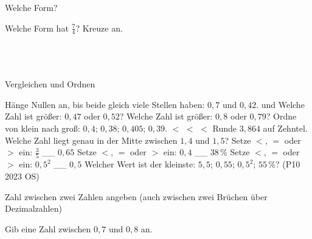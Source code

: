 \setcounter{aufgabe}{24}

\begin{aufgabe}{Welche Form?}
\begin{teile}
\teil Welche Form hat $\frac{7}{4}$? Kreuze an.\\ \\ \\ \\ 
\end{teile}
\end{aufgabe}

\begin{aufgabe}{Vergleichen und Ordnen}
\begin{teile}
\teil Hänge Nullen an, bis beide gleich viele Stellen haben: $0{,}7$ und $0{,}42$. \leerfeld und \leerfeld
\teil Welche Zahl ist größer: $0{,}47$ oder $0{,}52$? \leerfeld
\teil Welche Zahl ist größer: $0{,}8$ oder $0{,}79$? \leerfeld
\teil Ordne von klein nach groß: $0{,}4$; $0{,}38$; $0{,}405$; $0{,}39$. \leerfeld $<$ \leerfeld $<$ \leerfeld $<$ \leerfeld
\teil Runde $3{,}864$ auf Zehntel. \leerfeld
\teil Welche Zahl liegt genau in der Mitte zwischen $1{,}4$ und $1{,}5$? \leerfeld
\teil Setze $<$, $=$ oder $>$ ein: $\frac{3}{5}$ __ $0{,}65$ \leerfeld
\teil Setze $<$, $=$ oder $>$ ein: $0{,}4$ __ $38\,\%$ \leerfeld
\teil Setze $<$, $=$ oder $>$ ein: $0{,}5^2$ __ $0{,}5$ \leerfeld
\teil Welcher Wert ist der kleinste: $5{,}5$; $0{,}55$; $0{,}5^2$; $55\,\%$? \hfill (P10 2023 OS) \\ \leerfeld
\end{teile}
\end{aufgabe}

\begin{aufgabe}{Zahl zwischen zwei Zahlen angeben (auch zwischen zwei Brüchen über Dezimalzahlen)}
\begin{teile}
\teil Gib eine Zahl zwischen $0{,}7$ und $0{,}8$ an. \leerfeld
\end{teile}
\end{aufgabe}

